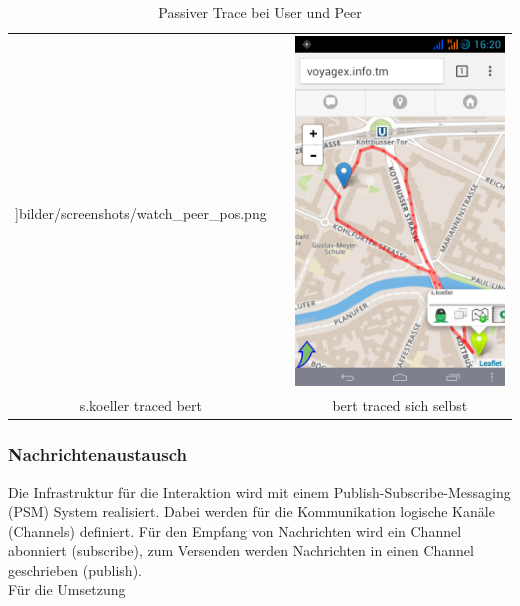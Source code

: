 \begin{table}[H]
\begin{adjustwidth}{-1.5cm}{1.5cm}
\begin{center}
\begin{tabulary}{20cm}{ C C C }
]{bilder/screenshots/watch_peer_pos.png} &  & \includegraphics[scale=0.35]{bilder/screenshots/watch_my_pos.png} \\
  	s.koeller traced bert & & bert traced sich selbst \\
  \end{tabulary}
  \caption{Passiver Trace bei User und Peer}
\end{center}
\end{adjustwidth}
\end{table}

\subsubsection{Nachrichtenaustausch}
Die Infrastruktur für die Interaktion wird mit einem Publish-Subscribe-Messaging (PSM) System realisiert. Dabei werden für die Kommunikation logische Kanäle (Channels) definiert. Für den Empfang von Nachrichten wird ein Channel abonniert (subscribe), zum Versenden werden Nachrichten in einen Channel geschrieben (publish).\\ Für die Umsetzung 
